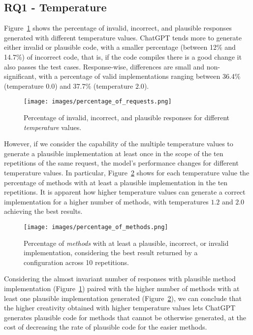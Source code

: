 
\subsection{RQ1 - Temperature}

Figure~\ref{fig:RequestsCorrectness} shows the percentage of invalid, incorrect, and plausible responses generated with different temperature values. ChatGPT tends more to generate either invalid or plausible code, with a smaller percentage (between 12\% and 14.7\%) of incorrect code, that is, if the code compiles there is a good change it also passes the test cases. Response-wise, differences are small and non-significant, with a percentage of valid implementations ranging between 36.4\% (temperature $0.0$) and 37.7\% (temperature $2.0$).

\begin{figure}[ht]
        \centering
        \texttt{[image: images/percentage\_of\_requests.png]}
        \caption{Percentage of invalid, incorrect, and plausible responses for different \emph{temperature} values.}
        \label{fig:RequestsCorrectness}
\end{figure}

However, if we consider the capability of the multiple temperature values to generate a plausible implementation at least once in the scope of the ten repetitions of the same request, the model's performance changes for different temperature values. In particular, Figure~\ref{fig:MethodsCorrectness} shows for each temperature value the percentage of methods with at least a plausible implementation in the ten repetitions.  It is apparent how higher temperature values can generate a correct implementation for a higher number of methods, with temperatures $1.2$ and $2.0$ achieving the best results.

\begin{figure}[ht]
        \centering
        \texttt{[image: images/percentage\_of\_methods.png]}
        \caption{Percentage of \emph{methods} with at least a plausible, incorrect, or invalid implementation, considering the best result returned by a configuration across 10 repetitions.}
        \label{fig:MethodsCorrectness}
\end{figure}

Considering the almost invariant number of responses with plausible method implementation (Figure~\ref{fig:RequestsCorrectness}) paired with the higher number of methods with at least one plausible implementation generated (Figure~\ref{fig:MethodsCorrectness}), we can conclude that the higher creativity obtained with higher temperature values lets ChatGPT generates plausible code for methods that cannot be otherwise generated, at the cost of decreasing the rate of plausible code for the easier methods.  

